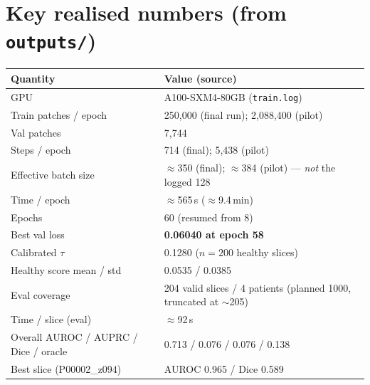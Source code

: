 \documentclass[11pt,a4paper]{article}
\newcommand{\code}[1]{\texttt{\small #1}}
\begin{document}
\section{Key realised numbers (from \code{outputs/})}
\begin{longtable}{@{}ll@{}}
\toprule
Quantity & Value (source) \\
\midrule
GPU & A100-SXM4-80GB (\code{train.log}) \\
Train patches / epoch & 250{,}000 (final run); 2{,}088{,}400 (pilot) \\
Val patches & 7{,}744 \\
Steps / epoch & 714 (final); 5{,}438 (pilot) \\
Effective batch size & $\approx$350 (final); $\approx$384 (pilot) --- \emph{not} the logged 128 \\
Time / epoch & $\approx$565\,s ($\approx$9.4\,min) \\
Epochs & 60 (resumed from 8) \\
Best val loss & \textbf{0.06040 at epoch 58} \\
Calibrated $\tau$ & 0.1280 ($n=200$ healthy slices) \\
Healthy score mean / std & 0.0535 / 0.0385 \\
Eval coverage & 204 valid slices / 4 patients (planned 1000, truncated at $\sim$205) \\
Time / slice (eval) & $\approx$92\,s \\
Overall AUROC / AUPRC / Dice / oracle & 0.713 / 0.076 / 0.076 / 0.138 \\
Best slice (P00002\_z094) & AUROC 0.965 / Dice 0.589 \\
\bottomrule
\end{longtable}
\end{document}
